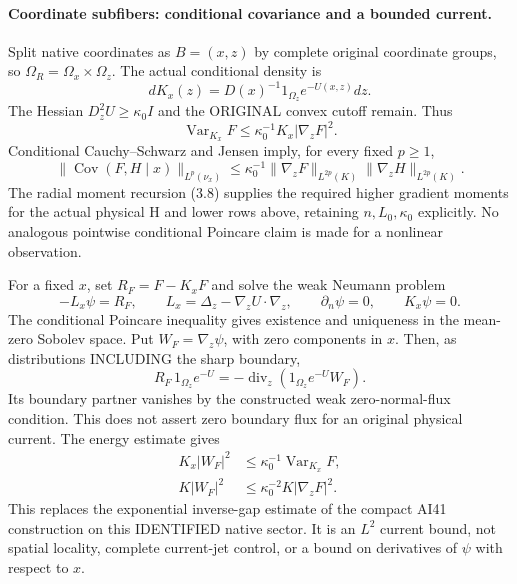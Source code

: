 \documentclass[11pt]{article}
\newcommand{\Cov}{\operatorname{Cov}}
\newcommand{\Var}{\operatorname{Var}}
\begin{document}
\paragraph{Coordinate subfibers: conditional covariance and a bounded current.}
Split native coordinates as $B=(x,z)$ by complete original coordinate groups, so
$\Omega_R=\Omega_x\times\Omega_z$. The actual conditional density is
\[
 dK_x(z)=D(x)^{-1}1_{\Omega_z}e^{-U(x,z)}dz.
\]
The Hessian $D_z^2U\ge\kappa_0I$ and the ORIGINAL convex cutoff remain. Thus
\[
 \Var_{K_x}F\le\kappa_0^{-1}K_x|\nabla_zF|^2.
\]
Conditional Cauchy--Schwarz and Jensen imply, for every fixed $p\ge1$,
\[
 \|\Cov(F,H\mid x)\|_{L^p(\nu_x)}
 \le\kappa_0^{-1}\|\nabla_zF\|_{L^{2p}(K)}
                         \|\nabla_zH\|_{L^{2p}(K)}.
\]
The radial moment recursion (3.8) supplies the required higher gradient moments for the
actual physical H and lower rows above, retaining $n,L_0,\kappa_0$ explicitly.
No analogous pointwise conditional Poincare claim is made for a nonlinear observation.

For a fixed $x$, set $R_F=F-K_xF$ and solve the weak Neumann problem
\[
 -L_x\psi=R_F,\qquad L_x=\Delta_z-\nabla_zU\cdot\nabla_z,
 \qquad \partial_n\psi=0,\qquad K_x\psi=0.
\]
The conditional Poincare inequality gives existence and uniqueness in the mean-zero
Sobolev space. Put $W_F=\nabla_z\psi$, with zero components in $x$.
Then, as distributions INCLUDING the sharp boundary,
\[
 R_F\,1_{\Omega_z}e^{-U}
 =-\operatorname{div}_z(1_{\Omega_z}e^{-U}W_F).
\]
Its boundary partner vanishes by the constructed weak zero-normal-flux condition.
This does not assert zero boundary flux for an original physical current.
The energy estimate gives
\begin{align}
 K_x|W_F|^2&\le\kappa_0^{-1}\Var_{K_x}F,\\
 K|W_F|^2&\le\kappa_0^{-2}K|\nabla_zF|^2.
\end{align}
This replaces the exponential inverse-gap estimate of the compact AI41 construction on
this IDENTIFIED native sector. It is an $L^2$ current bound, not spatial locality, complete
current-jet control, or a bound on derivatives of $\psi$ with respect to $x$.
\end{document}
